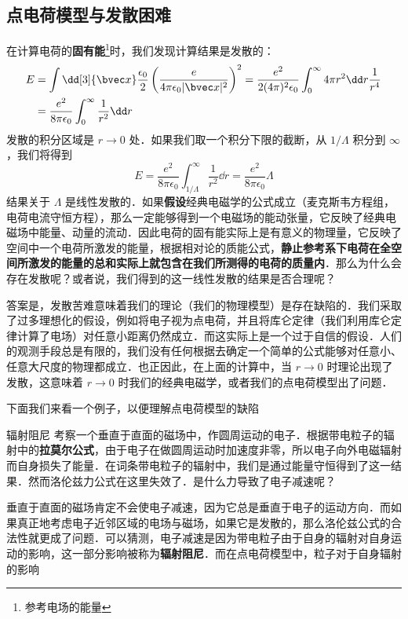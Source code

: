 
\subsection{点电荷模型与发散困难}
在计算电荷的\textbf{固有能}\footnote{参考电场的能量}时，我们发现计算结果是发散的：
\begin{equation}\label{elecdb_eq1}
\begin{aligned}
E&=\int \dd[3]{\bvec x}\frac{\epsilon_0}{2} \left(\frac{e}{4\pi\epsilon_0 |\bvec x|^2}\right)^2=\frac{e^2}{2(4\pi)^2\epsilon_0}\int_0^\infty 4\pi r^2\dd r \frac{1}{r^4}\\
&=\frac{e^2}{8\pi\epsilon_0} \int_0^\infty \frac{1}{r^2}\dd r
\end{aligned}
\end{equation}
发散的积分区域是 $r\rightarrow 0$ 处．如果我们取一个积分下限的截断，从 $1/\Lambda$ 积分到 $\infty$，我们将得到
\begin{equation}
E=\frac{e^2}{8\pi\epsilon_0}\int_{1/\Lambda}^{\infty} \frac{1}{r^2}\dd r=\frac{e^2}{8\pi\epsilon_0}\Lambda
\end{equation}
结果关于 $\Lambda$ 是线性发散的．如果\textbf{假设}经典电磁学的公式成立（麦克斯韦方程组，电荷电流守恒方程），那么一定能够得到一个电磁场的能动张量，它反映了经典电磁场中能量、动量的流动．因此电荷的固有能实际上是有意义的物理量，它反映了空间中一个电荷所激发的能量，根据相对论的质能公式，\textbf{静止参考系下电荷在全空间所激发的能量的总和实际上就包含在我们所测得的电荷的质量内}．那么为什么会存在发散呢？或者说，我们得到的这一线性发散的结果是否合理呢？

答案是，发散苦难意味着我们的理论（我们的物理模型）是存在缺陷的．我们采取了过多理想化的假设，例如将电子视为点电荷，并且将库仑定律（我们利用库仑定律计算了电场）对任意小距离仍然成立．而这实际上是一个过于自信的假设．人们的观测手段总是有限的，我们没有任何根据去确定一个简单的公式能够对任意小、任意大尺度的物理都成立．也正因此，在上面的计算中，当 $r\rightarrow 0$ 时理论出现了发散，这意味着 $r\rightarrow 0$ 时我们的经典电磁学，或者我们的点电荷模型出了问题．

下面我们来看一个例子，以便理解点电荷模型的缺陷
\begin{example}{辐射阻尼}
考察一个垂直于直面的磁场中，作圆周运动的电子．根据带电粒子的辐射中的\textbf{拉莫尔公式}，由于电子在做圆周运动时加速度非零，所以电子向外电磁辐射而自身损失了能量．在词条带电粒子的辐射中，我们是通过能量守恒得到了这一结果．然而洛伦兹力公式在这里失效了．是什么力导致了电子减速呢？
\end{example}
垂直于直面的磁场肯定不会使电子减速，因为它总是垂直于电子的运动方向．而如果真正地考虑电子近邻区域的电场与磁场，如果它是发散的，那么洛伦兹公式的合法性就更成了问题．可以猜测，电子减速是因为带电粒子由于自身的辐射对自身运动的影响，这一部分影响被称为\textbf{辐射阻尼}．而在点电荷模型中，粒子对于自身辐射的影响


